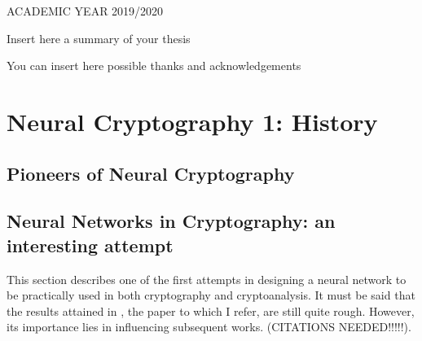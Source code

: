 \documentclass[%
    corpo=11pt,
    twoside,
    stile=classica,
    oldstyle,
    autoretitolo,
    tipotesi=magistrale,
    greek,
    evenboxes,
    english
]{toptesi}
\begin{document}
\centerline{ACADEMIC YEAR 2019/2020}






\sommario

Insert here a summary of your thesis

\ringraziamenti

You can insert here possible thanks and acknowledgements

\tablespagetrue\figurespagetrue %
\indici

\mainmatter

\chapter{Neural Cryptography 1: History}
\section{Pioneers of Neural Cryptography}
\newpage

\section{Neural Networks in Cryptography: an interesting attempt}
This section describes one of the first attempts in designing a neural network to be practically used in both cryptography and cryptoanalysis. It must be said that the results attained in \cite{volna}, the paper to which I refer, are still quite rough. However, its importance lies in influencing subsequent works. (CITATIONS NEEDED!!!!!).
\end{document}
